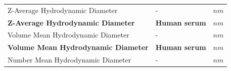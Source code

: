 \documentclass[utf8]{frontiersHLTH} %
\begin{document}
\begin{longtable}[]{@{}lll@{}}
\begin{minipage}[t]{0.58\columnwidth}
Z-Average Hydrodynamic Diameter\strut
\end{minipage} & \begin{minipage}[t]{0.20\columnwidth}\raggedright\strut
-\strut
\end{minipage} & \begin{minipage}[t]{0.13\columnwidth}\raggedright\strut
\(nm\)\strut
\end{minipage}\tabularnewline
\begin{minipage}[t]{0.58\columnwidth}\raggedright\strut
\textbf{Z-Average Hydrodynamic Diameter}\strut
\end{minipage} & \begin{minipage}[t]{0.20\columnwidth}\raggedright\strut
\textbf{Human serum}\strut
\end{minipage} & \begin{minipage}[t]{0.13\columnwidth}\raggedright\strut
\(nm\)\strut
\end{minipage}\tabularnewline
\begin{minipage}[t]{0.58\columnwidth}\raggedright\strut
Volume Mean Hydrodynamic Diameter\strut
\end{minipage} & \begin{minipage}[t]{0.20\columnwidth}\raggedright\strut
-\strut
\end{minipage} & \begin{minipage}[t]{0.13\columnwidth}\raggedright\strut
\(nm\)\strut
\end{minipage}\tabularnewline
\begin{minipage}[t]{0.58\columnwidth}\raggedright\strut
\textbf{Volume Mean Hydrodynamic Diameter}\strut
\end{minipage} & \begin{minipage}[t]{0.20\columnwidth}\raggedright\strut
\textbf{Human serum}\strut
\end{minipage} & \begin{minipage}[t]{0.13\columnwidth}\raggedright\strut
\(nm\)\strut
\end{minipage}\tabularnewline
\begin{minipage}[t]{0.58\columnwidth}\raggedright\strut
Number Mean Hydrodynamic Diameter\strut
\end{minipage} & \begin{minipage}[t]{0.20\columnwidth}\raggedright\strut
-\strut
\end{minipage} & \begin{minipage}[t]{0.13\columnwidth}\raggedright\strut
\(nm\)\strut
\end{minipage}\tabularnewline

\end{longtable}
\end{document}

